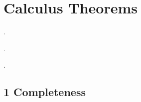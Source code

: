 \chapter{Calculus Theorems}

  {}%
  {}%
  {}%
  {}%
  {\bfseries}%
  {.}%
  { }%
  {}%

  {}%
  {}%
  {}%
  {}%
  {\bfseries}%
  {.}%
  { }%
  {}%

  {}%
  {}%
  {}%
  {}%
  {}%
  {.}%
  { }%
  {}%

\theoremstyle{ethantheorem}
\newtheorem*{theorem}{Theorem}
\newtheorem*{procedure}{Procedure}

\theoremstyle{ethannamedtheorem}
\newtheorem*{namedtheorem}{Theorem}
\newtheorem*{namedprocedure}{Procedure}

\theoremstyle{ethandefinition}
\newtheorem*{definition}{Definition}

\section*{1 Completeness}

